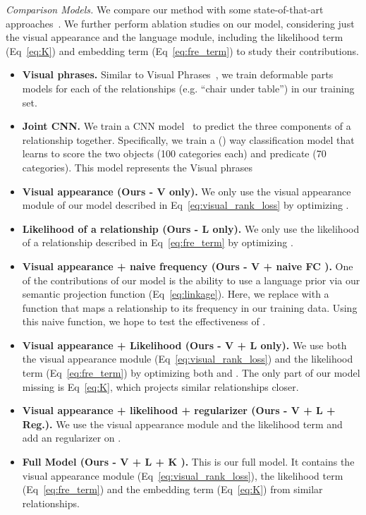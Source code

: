 \documentclass[runningheads]{llncs}
\newcommand{\eg}[1]{e.g. #1}
\begin{document}
\textit{Comparison Models.} We compare our method with some state-of-that-art approaches~\cite{sadeghi2011recognition,simonyan2014very}. We further perform ablation studies on our model, considering just the visual appearance and the language module, including the likelihood term (Eq~\ref{eq:K}) and embedding term (Eq~\ref{eq:fre_term}) to study their contributions.

\begin{itemize}
\setlength\itemsep{0em}
\item \textbf{Visual phrases.} Similar to Visual Phrases~\cite{sadeghi2011recognition}, we train deformable parts models for each of the  relationships (\eg ``chair under table'') in our training set.
\item \textbf{Joint CNN.} We train a CNN model~\cite{simonyan2014very} to predict the three components of a relationship together. Specifically, we train a  () way classification model that learns to score the two objects (100 categories each) and predicate (70 categories). This model represents the Visual phrases 
\item \textbf{Visual appearance (Ours - V only).} We only use the visual appearance module of our model described in Eq~\ref{eq:visual_rank_loss} by optimizing .
\item \textbf{Likelihood of a relationship (Ours - L only).} We only use the likelihood of a relationship described in Eq~\ref{eq:fre_term} by optimizing .
\item \textbf{Visual appearance + naive frequency (Ours - V + naive FC ).} One of the contributions of our model is the ability to use a language prior via our semantic projection function  (Eq~\ref{eq:linkage}). Here, we replace  with a function that maps a relationship to its frequency in our training data. Using this naive function, we hope to test the effectiveness of .
\item \textbf{Visual appearance + Likelihood (Ours - V + L only).} We use both the visual appearance module (Eq~\ref{eq:visual_rank_loss}) and the likelihood term (Eq~\ref{eq:fre_term}) by optimizing both  and . The only part of our model missing is  Eq~\ref{eq:K}, which projects similar relationships closer.
\item \textbf{Visual appearance + likelihood + regularizer (Ours - V + L + Reg.).} We use the visual appearance module and the likelihood term and add an  regularizer on .
\item \textbf{Full Model (Ours - V + L + K ).} This is our full model. It contains the visual appearance module (Eq~\ref{eq:visual_rank_loss}), the likelihood term (Eq~\ref{eq:fre_term}) and the embedding term (Eq~\ref{eq:K}) from similar relationships.
\end{itemize}
\end{document}
